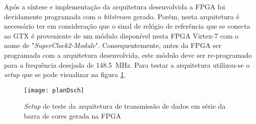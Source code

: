 %



Após a síntese e implementação da arquitetura desenvolvida a FPGA foi devidamente programada com o \textit{bitstream} gerado. Porém, nesta arquitetura é necessário ter em consideração que o sinal de relógio de referência que se conecta ao GTX é proveniente de um módulo disponível nesta FPGA Virtex-7 com o nome de "\textit{SuperClock2-Module}". Consequentemente, antes da FPGA ser programada com a arquitetura desenvolvida, este módulo deve ser re-programado para a frequência desejada de \SI{148.5}{\mega\hertz}. Para testar a arquitetura utilizou-se o \textit{setup} que se pode visualizar na figura \ref{fig:planD_setup}.
\begin{figure}[h!]
	\begin{center}
		\leavevmode
		\texttt{[image: planDsch]}
		\captionsetup{width=1.0\linewidth}
		\caption[\textit{Setup} de teste da arquitetura]{\textit{Setup} de teste da arquitetura de transmissão de dados em série da barra de cores gerada na FPGA}
		\label{fig:planD_setup}
	\end{center}
\end{figure}

